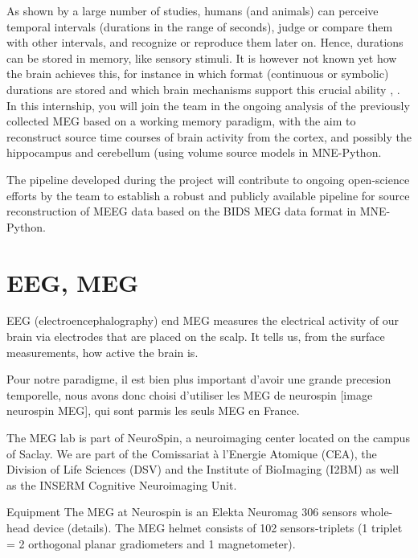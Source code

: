 As shown by a large number of studies, humans (and animals) can perceive
temporal intervals (durations in the range of seconds), judge or compare them with other
intervals, and recognize or reproduce them later on. Hence, durations can be stored in
memory, like sensory stimuli. It is however not known yet how the brain achieves this, for
instance in which format (continuous or symbolic) durations are stored and which brain
mechanisms support this crucial ability \cite{polti2018effect}, \cite{teki2014working}. In this internship, you will join the team in the
ongoing analysis of the previously collected MEG based on a working memory paradigm,
with the aim to reconstruct source time courses of brain activity from the cortex, and
possibly the hippocampus and cerebellum \cite{gauthier2020hippocampal}(using volume source models in MNE-Python.

The pipeline developed during the project will contribute to ongoing open-science
efforts by the team to establish a robust and publicly available pipeline for source
reconstruction of MEEG data based on the BIDS MEG data format in MNE-Python.



\section{EEG, MEG}



EEG (electroencephalography) end MEG measures the electrical activity of our brain via electrodes that are placed on the scalp. It tells us, from the surface measurements, how active the brain is.

Pour notre paradigme, il est bien plus important d'avoir une grande precesion temporelle, nous avons donc choisi d'utiliser les MEG de neurospin [image neurospin MEG], qui sont parmis les seuls MEG en France.


The MEG lab is part of NeuroSpin, a neuroimaging center located on the campus of Saclay. We are part of the Comissariat à l'Energie Atomique (CEA), the Division of Life Sciences (DSV) and the Institute of BioImaging (I2BM) as well as the INSERM Cognitive Neuroimaging Unit.

Equipment
The MEG at Neurospin is an Elekta Neuromag 306 sensors whole-head device (details). The MEG helmet consists of 102 sensors-triplets (1 triplet = 2 orthogonal planar gradiometers and 1 magnetometer).


